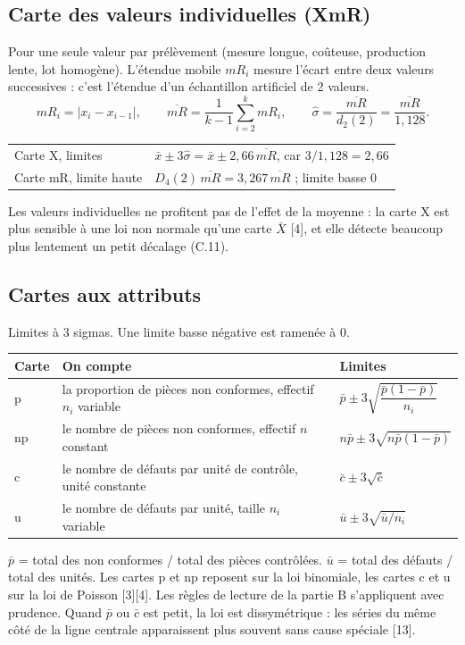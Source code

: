 \documentclass[11pt,a4paper]{article}
\begin{document}
\subsection{Carte des valeurs individuelles (XmR)}\label{sec:xmr}
Pour une seule valeur par prélèvement (mesure longue, coûteuse, production lente, lot homogène). L'étendue mobile $mR_i$ mesure l'écart entre deux valeurs successives : c'est l'étendue d'un échantillon artificiel de 2 valeurs.
\[
mR_i=|x_i-x_{i-1}|,\qquad \overline{mR}=\frac1{k-1}\sum_{i=2}^k mR_i,\qquad \hat\sigma=\frac{\overline{mR}}{d_2(2)}=\frac{\overline{mR}}{1{,}128}.
\]
\begin{center}\small
\begin{tabular}{@{}ll@{}}\toprule
Carte X, limites & $\bar x\pm3\hat\sigma=\bar x\pm2{,}66\,\overline{mR}$, car $3/1{,}128=2{,}66$\\
Carte mR, limite haute & $D_4(2)\,\overline{mR}=3{,}267\,\overline{mR}$ ; limite basse 0\\\bottomrule
\end{tabular}
\end{center}
Les valeurs individuelles ne profitent pas de l'effet de la moyenne : la carte X est plus sensible à une loi non normale qu'une carte $\bar X$ [4], et elle détecte beaucoup plus lentement un petit décalage (C.11).

\subsection{Cartes aux attributs}\label{sec:attr}
Limites à 3 sigmas. Une limite basse négative est ramenée à 0.
\begin{center}\small
\renewcommand{\arraystretch}{1.7}
\begin{tabularx}{\textwidth}{@{}lXl@{}}\toprule
\textbf{Carte} & \textbf{On compte} & \textbf{Limites}\\\midrule
p & la proportion de pièces non conformes, effectif $n_i$ variable & $\bar p\pm3\sqrt{\dfrac{\bar p(1-\bar p)}{n_i}}$\\
np & le nombre de pièces non conformes, effectif $n$ constant & $n\bar p\pm3\sqrt{n\bar p(1-\bar p)}$\\
c & le nombre de défauts par unité de contrôle, unité constante & $\bar c\pm3\sqrt{\bar c}$\\
u & le nombre de défauts par unité, taille $n_i$ variable & $\bar u\pm3\sqrt{\bar u/n_i}$\\\bottomrule
\end{tabularx}
\end{center}
$\bar p$ = total des non conformes / total des pièces contrôlées. $\bar u$ = total des défauts / total des unités. Les cartes p et np reposent sur la loi binomiale, les cartes c et u sur la loi de Poisson [3][4]. Les règles de lecture de la partie B s'appliquent avec prudence. Quand $\bar p$ ou $\bar c$ est petit, la loi est dissymétrique : les séries du même côté de la ligne centrale apparaissent plus souvent sans cause spéciale [13].
\end{document}
